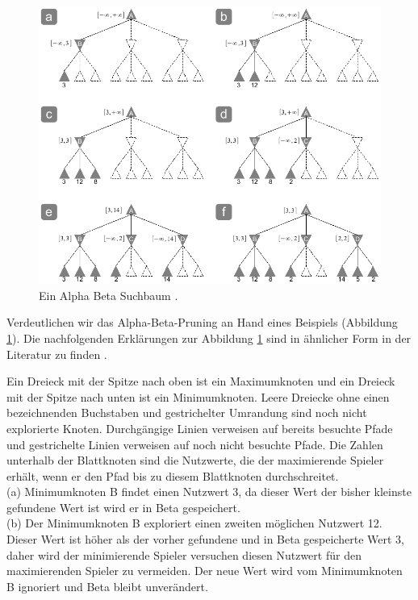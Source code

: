 \begin{figure}[!htbp]
  \centering
  \includegraphics[scale = 0.8]{inhalt/abbildungen/alpha_beta_suchbaum.pdf}
  \caption{Ein Alpha Beta Suchbaum \cite[213]{Russell}.}
  \label{fig:alpha_beta}
\end{figure} 

Verdeutlichen wir das Alpha-Beta-Pruning an Hand eines Beispiels (Abbildung \ref{fig:alpha_beta}). Die nachfolgenden Erklärungen zur Abbildung \ref{fig:alpha_beta} sind in ähnlicher Form in der Literatur zu finden \cite[212 \psqq]{Russell}. 
\newpage

Ein Dreieck mit der Spitze nach oben ist ein Maximumknoten und ein Dreieck mit der Spitze nach unten ist ein Minimumknoten. Leere Dreiecke ohne einen bezeichnenden Buchstaben und gestrichelter Umrandung sind noch nicht explorierte Knoten. Durchgängige Linien verweisen auf bereits besuchte Pfade und gestrichelte Linien verweisen auf noch nicht besuchte Pfade. Die Zahlen unterhalb der Blattknoten sind die Nutzwerte, die der maximierende Spieler erhält, wenn er den Pfad bis zu diesem Blattknoten durchschreitet. \\

(a) Minimumknoten B findet einen Nutzwert 3, da dieser Wert der bisher kleinste gefundene Wert ist wird er in Beta gespeichert. \\

(b) Der Minimumknoten B exploriert einen zweiten möglichen Nutzwert 12. Dieser Wert ist höher als der vorher gefundene und in Beta gespeicherte Wert 3, daher wird der minimierende Spieler versuchen diesen Nutzwert für den maximierenden Spieler zu vermeiden. Der neue Wert wird vom Minimumknoten B ignoriert und Beta bleibt unverändert. \\

